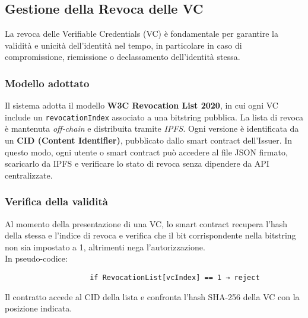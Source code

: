        \subsection{Gestione della Revoca delle VC}
            La revoca delle Verifiable Credentials (VC) è fondamentale per garantire la validità e unicità dell'identità nel tempo, in particolare in caso di compromissione, riemissione o declassamento dell'identità stessa.
            
            \subsubsection{Modello adottato}
                \noindent Il sistema adotta il modello \textbf{W3C Revocation List 2020}, in cui ogni VC include un \texttt{revocationIndex} associato a una bitstring pubblica.
                La lista di revoca è mantenuta \textit{off-chain} e distribuita tramite \textit{IPFS}. Ogni versione è identificata da un \textbf{CID (Content Identifier)}, pubblicato dallo smart contract dell'Issuer.
                In questo modo, ogni utente o smart contract può accedere al file JSON firmato, scaricarlo da IPFS e verificare lo stato di revoca senza dipendere da API centralizzate.
            
            \subsubsection{Verifica della validità}
                \noindent Al momento della presentazione di una VC, lo smart contract recupera l'hash della stessa e l'indice di revoca e verifica che il bit corrispondente nella bitstring non sia impostato a 1, altrimenti nega l'autorizzazione. \\
        
                \noindent In pseudo-codice:
                    \begin{verbatim}
                    if RevocationList[vcIndex] == 1 → reject
                    \end{verbatim}
        
                \noindent Il contratto accede al CID della lista e confronta l’hash SHA-256 della VC con la posizione indicata.
            
